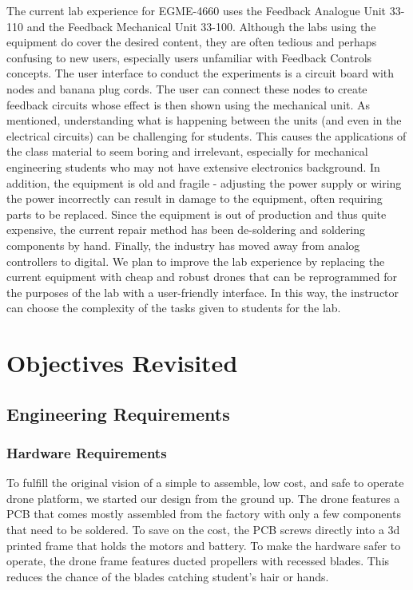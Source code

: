\documentclass[12pt, titlepage]{article}
\begin{document}
The current lab experience for EGME-4660 uses the Feedback Analogue Unit 33-110 and the Feedback Mechanical Unit 33-100. Although the labs using the equipment do cover the desired content, they are often tedious and perhaps confusing to new users, especially users unfamiliar with Feedback Controls concepts. The user interface to conduct the experiments is a circuit board with nodes and banana plug cords. The user can connect these nodes to create feedback circuits whose effect is then shown using the mechanical unit. As mentioned, understanding what is happening between the units (and even in the electrical circuits) can be challenging for students. This causes the applications of the class material to  seem boring and irrelevant, especially for mechanical engineering students who may not have extensive electronics background. In addition, the equipment is old and fragile - adjusting the power supply or wiring the power incorrectly can result in damage to the equipment, often requiring parts to be replaced. Since the equipment is out of production and thus quite expensive, the current repair method has been de-soldering and soldering components by hand. Finally, the industry has moved away from analog controllers to digital. We plan to improve the lab experience by replacing the current equipment with cheap and robust drones that can be reprogrammed for the purposes of the lab with a user-friendly interface. In this way, the instructor can choose the complexity of the tasks given to students for the lab. 

\section{Objectives Revisited}
\subsection{Engineering Requirements}
\subsubsection{Hardware Requirements}
To fulfill the original vision of a simple to assemble, low cost, and safe to operate drone platform, we started our design from the ground up. 
The drone features a PCB that comes mostly assembled from the factory with only a few components that need to be soldered. To save on the cost, the PCB screws directly into a 3d printed frame that holds the motors and battery. To make the hardware safer to operate, the drone frame features ducted propellers with recessed blades. This reduces the chance of the blades catching student's hair or hands. 
\end{document}
